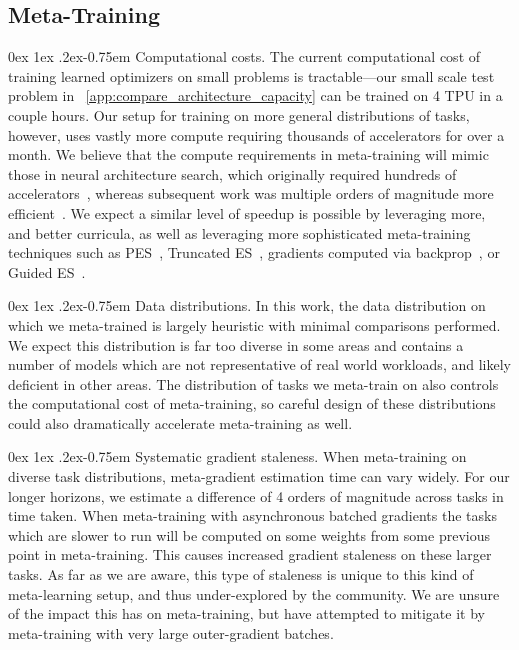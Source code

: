 \documentclass[11pt]{article}
\makeatletter
\renewcommand{\paragraph}{%
  \@startsection{paragraph}{4}%
  {\z@}{0ex \@plus 1ex \@minus .2ex}{-0.75em}%
  {\normalfont\normalsize\bfseries}%
}
\makeatother
\begin{document}
\subsection{Meta-Training}
\paragraph{Computational costs.}
The current computational cost of training learned optimizers on small problems is tractable---our small scale test problem in ~\ref{app:compare_architecture_capacity} can be trained on 4 TPU in a couple hours.
Our setup for training on more general distributions of tasks, however, uses vastly more compute requiring thousands of accelerators for over a month.
We believe that the compute requirements in meta-training will mimic those in neural architecture search, which originally required hundreds of accelerators~\citep{zoph2017}, whereas subsequent work was multiple orders of magnitude more efficient~\citep{pham2018efficient}.
We expect a similar level of speedup is possible by leveraging more, and better curricula, as well as leveraging more sophisticated meta-training techniques such as PES~\citep{pmlr-v139-vicol21a}, Truncated ES~\citep{metz2019understanding}, gradients computed via backprop~\citep{metz2019understanding}, or Guided ES~\citep{maheswaranathan2019guided}.

\paragraph{Data distributions.}
In this work, the data distribution on which we meta-trained is largely heuristic with minimal comparisons performed.
We expect this distribution is far too diverse in some areas and contains a number of models which are not representative of real world workloads, and likely deficient in other areas. 
The distribution of tasks we meta-train on also controls the computational cost of meta-training, so careful design of these distributions could also dramatically accelerate meta-training as well.

\paragraph{Systematic gradient staleness.}
When meta-training on diverse task distributions, meta-gradient estimation time can vary widely. For our longer horizons, we estimate a difference of 4 orders of magnitude across tasks in time taken.
When meta-training with asynchronous batched gradients the tasks which are slower to run will be computed on some weights from some previous point in meta-training.
This causes increased gradient staleness on these larger tasks.
As far as we are aware, this type of staleness is unique to this kind of meta-learning setup, and thus under-explored by the community.
We are unsure of the impact this has on meta-training, but have attempted to mitigate it by meta-training with very large outer-gradient batches.
\end{document}
